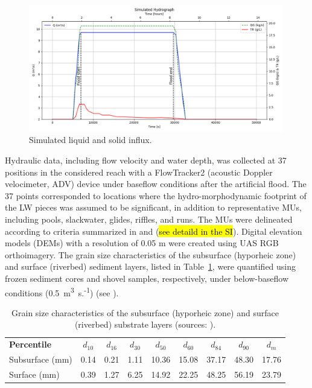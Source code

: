 \documentclass[draft,linenumbers,onecolumn]{agujournal2019} %
\begin{document}
\begin{figure}[htbp]
	\centering
	\includegraphics[width=0.99\textwidth]{2_hydrograph.png}
	\caption{Simulated liquid and solid influx.	}
	\label{fig:inflow-hydrograph}
\end{figure}
Hydraulic data, including flow velocity and water depth, was collected at 37 positions in the considered reach with a FlowTracker2 (acoustic Doppler velocimeter, ADV) device under baseflow conditions after the artificial flood. The 37 points corresponded to locations where the hydro-morphodynamic footprint of the LW pieces was assumed to be significant, in addition to representative MUs, including pools, slackwater, glides, riffles, and runs. The MUs were delineated according to criteria summarized in  and  (\hl{see detaild in the SI}). Digital elevation models (DEMs) with a resolution of 0.05 m were created using UAS RGB orthoimagery. The grain size characteristics of the subsurface (hyporheic zone) and surface (riverbed) sediment layers, listed in Table~\ref{tab:grain-sizes}, were quantified using frozen sediment cores and shovel samples, respectively, under below-baseflow conditions (0.5~m\textsuperscript{3}~s.\textsuperscript{-1}) (see ).

\begin{table}[h]
	\centering
	\caption{Grain size characteristics of the subsurface (hyporheic zone) and surface (riverbed) substrate layers (sources: ).}
	\begin{tabular}{lcccccccc}
		\hline
		\textbf{Percentile} & $d_{10}$ & $d_{16}$ & $d_{30}$ & $d_{50}$ & $d_{60}$ & $d_{84}$ & $d_{90}$ & $d_m$\\
		Subsurface (mm)       & 0.14 & 0.21 & 1.11 & 10.36 & 15.08 & 37.17 & 48.30 & 17.76 \\
		Surface (mm)          & 0.39 & 1.27 & 6.25 & 14.92 & 22.25 & 48.25 & 56.19 & 23.79 \\
		\hline
	\end{tabular}
	\label{tab:grain-sizes}
\end{table}
\end{document}
